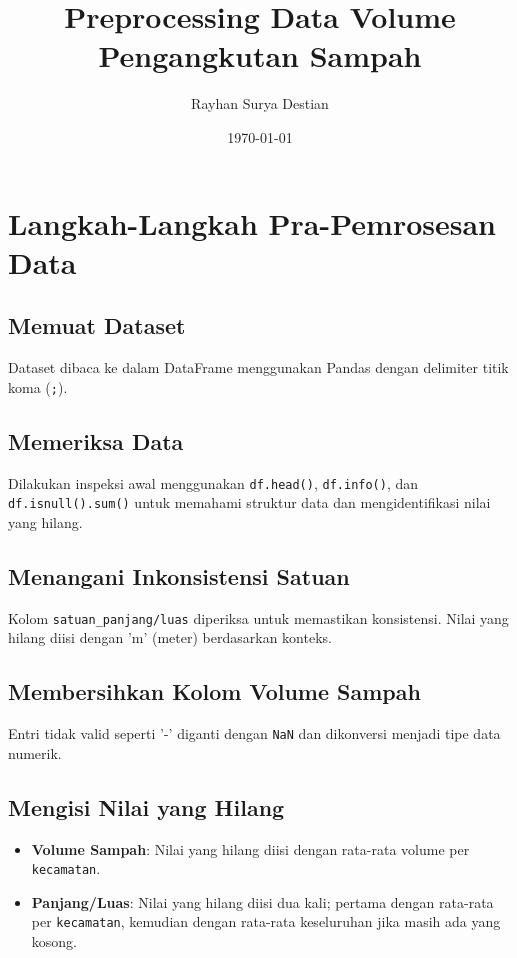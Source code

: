 \documentclass{article}
\title{Preprocessing Data Volume Pengangkutan Sampah}
\author{Rayhan Surya Destian}
\date{\today}
\begin{document}
\maketitle

\section{Langkah-Langkah Pra-Pemrosesan Data}

\subsection{Memuat Dataset}
Dataset dibaca ke dalam DataFrame menggunakan Pandas dengan delimiter titik koma (\texttt{;}).

\subsection{Memeriksa Data}
Dilakukan inspeksi awal menggunakan \texttt{df.head()}, \texttt{df.info()}, dan \texttt{df.isnull().sum()} untuk memahami struktur data dan mengidentifikasi nilai yang hilang.

\subsection{Menangani Inkonsistensi Satuan}
Kolom \texttt{satuan\_panjang/luas} diperiksa untuk memastikan konsistensi. Nilai yang hilang diisi dengan 'm' (meter) berdasarkan konteks.

\subsection{Membersihkan Kolom Volume Sampah}
Entri tidak valid seperti '-' diganti dengan \texttt{NaN} dan dikonversi menjadi tipe data numerik.

\subsection{Mengisi Nilai yang Hilang}
\begin{itemize}
    \item \textbf{Volume Sampah}: Nilai yang hilang diisi dengan rata-rata volume per \texttt{kecamatan}.
    \item \textbf{Panjang/Luas}: Nilai yang hilang diisi dua kali; pertama dengan rata-rata per \texttt{kecamatan}, kemudian dengan rata-rata keseluruhan jika masih ada yang kosong.
\end{itemize}
\end{document}
